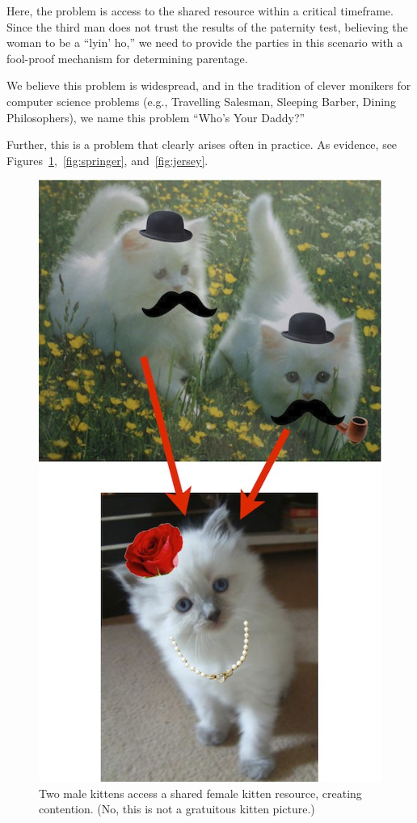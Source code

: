 \documentclass[nocopyrightspace,10pt]{sigplanconf}
\begin{document}
Here, the problem is access to the shared resource within a critical timeframe. Since the third man does not trust the results of the paternity test, believing the woman to be a ``lyin' ho,'' we need to provide the parties in this scenario with a fool-proof mechanism for determining parentage.

We believe this problem is widespread, and in the tradition of clever monikers for computer science problems (e.g., Travelling Salesman, Sleeping Barber, Dining Philosophers), we name this problem ``Who's Your Daddy?''

Further, this is a problem that clearly arises often in practice. As evidence, see Figures~\ref{fig:kittens},~\ref{fig:springer}, and~\ref{fig:jersey}.

\begin{figure}[tbh!]
\centering
\includegraphics[width=0.9\linewidth]{kittens.jpg}
\caption{Two male kittens access a shared female kitten resource, creating contention. (No, this is not a gratuitous kitten picture.)}
\label{fig:kittens}
\end{figure}
\end{document}
